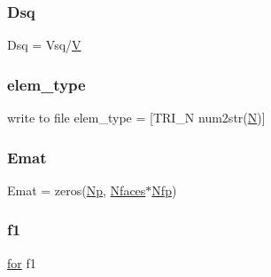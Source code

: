 \subsubsection{\texorpdfstring{Dsq}{Dsq}}
{\footnotesize\ttfamily Dsq = Vsq/\hyperlink{a00575_af658e24e5ad7935911c432c5c02d895c}{V}}

\mbox{\label{a00473_a9e84386471d07238c03b10507f58eba9}} 
\subsubsection{\texorpdfstring{elem\+\_\+type}{elem\_type}}
{\footnotesize\ttfamily write to file elem\+\_\+type = \mbox{[}\textquotesingle{}T\+R\+I\+\_\+N\textquotesingle{} num2str(\hyperlink{a00473_a5b9c4563028063ee53b517cce9aa701b}{N})\mbox{]}}

\mbox{\label{a00473_a2e8c475217f58955f41f40d84bd99568}} 
\subsubsection{\texorpdfstring{Emat}{Emat}}
{\footnotesize\ttfamily Emat = zeros(\hyperlink{a00575_abe50207e56666a60c81e2a58f522eea3}{Np}, \hyperlink{a00575_aac4846947deeade1c4227c400ab38c13}{Nfaces}$\ast$\hyperlink{a00575_a20f422f104b7455cf2904b755786b44f}{Nfp})}

\mbox{\label{a00473_a47dc4ee2bceaf5a9f6d47cb10353a96f}} 
\subsubsection{\texorpdfstring{f1}{f1}}
{\footnotesize\ttfamily \hyperlink{a00623_ad1e7380d51df1e0043d24d3c8a860e0a}{for} f1}

